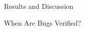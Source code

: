 \begin{section}{Results and Discussion}
\begin{subsection}{When Are Bugs Verified?}
	
	
	
	
	
	
	

\end{subsection}
\end{section}
